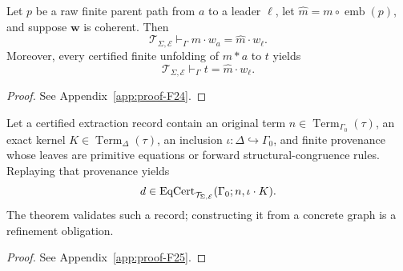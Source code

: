 \begin{lemma}
\label{lem:find-cert}
Let $p$ be a raw finite parent path from $a$ to a leader $\ell$, let
$\widehat m=m\circ\operatorname{emb}(p)$, and suppose $\mathbf w$ is
coherent.  Then
\begin{equation}
\label{eq:find-witness}
\mathcal T_{\Sigma,\mathcal E}\vdash_\Gamma
m\cdot w_a=\widehat m\cdot w_\ell.
\end{equation}
Moreover, every certified finite unfolding of $m*a$ to $t$ yields
\begin{equation}
\label{eq:rep-witness}
\mathcal T_{\Sigma,\mathcal E}\vdash_\Gamma
t=\widehat m\cdot w_\ell.
\end{equation}
\end{lemma}
\begin{proof}See Appendix~\ref{app:proof-F24}.\end{proof}

\begin{lemma}
\label{lem:kernel-cert}
Let a certified extraction record contain an original term
$n\in\operatorname{Term}_{\Gamma_0}(\tau)$, an exact kernel
$K\in\operatorname{Term}_{\Delta}(\tau)$, an inclusion
$\iota:\Delta\hookrightarrow\Gamma_0$, and finite provenance whose leaves
are primitive equations or forward structural-congruence rules.  Replaying
that provenance yields
\begin{equation}
\label{eq:kernel-certificate}
d\in
\operatorname{EqCert}_{\mathcal T_{\Sigma,\mathcal E}}
(\Gamma_0;n,\iota\cdot K).
\end{equation}
The theorem validates such a record; constructing it from a concrete graph is
a refinement obligation.
\end{lemma}
\begin{proof}See Appendix~\ref{app:proof-F25}.\end{proof}

